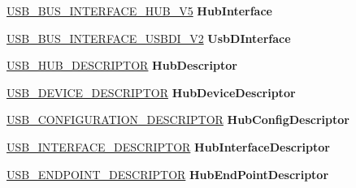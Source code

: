 \begin{DoxyCompactItemize}
\hyperlink{struct___u_s_b___b_u_s___i_n_t_e_r_f_a_c_e___h_u_b___v5}{U\+S\+B\+\_\+\+B\+U\+S\+\_\+\+I\+N\+T\+E\+R\+F\+A\+C\+E\+\_\+\+H\+U\+B\+\_\+\+V5} {\bfseries Hub\+Interface}
\item 
\mbox{\label{struct___h_u_b___d_e_v_i_c_e___e_x_t_e_n_s_i_o_n_a54c76c0e6a17ccbff0ee8ce602ac8fa1}} 
\hyperlink{struct___u_s_b___b_u_s___i_n_t_e_r_f_a_c_e___u_s_b_d_i___v2}{U\+S\+B\+\_\+\+B\+U\+S\+\_\+\+I\+N\+T\+E\+R\+F\+A\+C\+E\+\_\+\+U\+S\+B\+D\+I\+\_\+\+V2} {\bfseries Usb\+D\+Interface}
\item 
\mbox{\label{struct___h_u_b___d_e_v_i_c_e___e_x_t_e_n_s_i_o_n_ab1b47ae0b20e38d9c460def923f73939}} 
\hyperlink{struct___u_s_b___h_u_b___d_e_s_c_r_i_p_t_o_r}{U\+S\+B\+\_\+\+H\+U\+B\+\_\+\+D\+E\+S\+C\+R\+I\+P\+T\+OR} {\bfseries Hub\+Descriptor}
\item 
\mbox{\label{struct___h_u_b___d_e_v_i_c_e___e_x_t_e_n_s_i_o_n_a1076151c55b32055da8ef57f8a317e7c}} 
\hyperlink{struct___u_s_b___d_e_v_i_c_e___d_e_s_c_r_i_p_t_o_r}{U\+S\+B\+\_\+\+D\+E\+V\+I\+C\+E\+\_\+\+D\+E\+S\+C\+R\+I\+P\+T\+OR} {\bfseries Hub\+Device\+Descriptor}
\item 
\mbox{\label{struct___h_u_b___d_e_v_i_c_e___e_x_t_e_n_s_i_o_n_acdfb8027187e1c09a09e2aaa7265bc2e}} 
\hyperlink{struct___u_s_b___c_o_n_f_i_g_u_r_a_t_i_o_n___d_e_s_c_r_i_p_t_o_r}{U\+S\+B\+\_\+\+C\+O\+N\+F\+I\+G\+U\+R\+A\+T\+I\+O\+N\+\_\+\+D\+E\+S\+C\+R\+I\+P\+T\+OR} {\bfseries Hub\+Config\+Descriptor}
\item 
\mbox{\label{struct___h_u_b___d_e_v_i_c_e___e_x_t_e_n_s_i_o_n_a13c0dd4038367a33f41c57e12af6b6b6}} 
\hyperlink{struct___u_s_b___i_n_t_e_r_f_a_c_e___d_e_s_c_r_i_p_t_o_r}{U\+S\+B\+\_\+\+I\+N\+T\+E\+R\+F\+A\+C\+E\+\_\+\+D\+E\+S\+C\+R\+I\+P\+T\+OR} {\bfseries Hub\+Interface\+Descriptor}
\item 
\mbox{\label{struct___h_u_b___d_e_v_i_c_e___e_x_t_e_n_s_i_o_n_a87344c35128a181b8d92bab4a885427a}} 
\hyperlink{struct___u_s_b___e_n_d_p_o_i_n_t___d_e_s_c_r_i_p_t_o_r}{U\+S\+B\+\_\+\+E\+N\+D\+P\+O\+I\+N\+T\+\_\+\+D\+E\+S\+C\+R\+I\+P\+T\+OR} {\bfseries Hub\+End\+Point\+Descriptor}

\end{DoxyCompactItemize}
